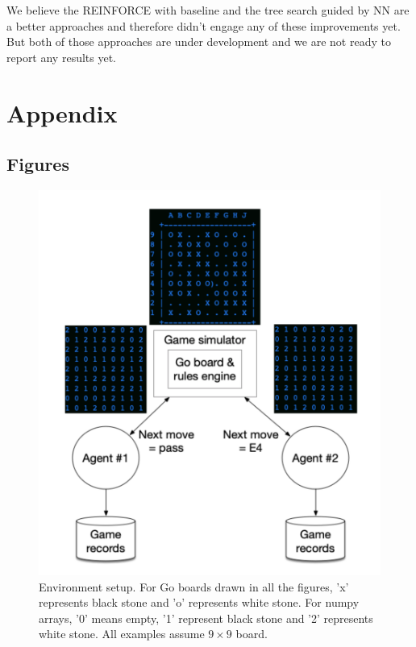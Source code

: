 \documentclass{article}
\begin{document}
    We believe the REINFORCE with baseline and the tree search guided by NN are a better approaches and therefore didn't engage any of these improvements yet.  But both of those approaches are under development and we are not ready to report any results yet. 


 

\newpage

\section{Appendix}
\subsection{Figures}
\begin{figure}
\centering
\includegraphics[width=0.8\linewidth]{simulator}
\caption{Environment setup. For Go boards drawn in all the figures, 'x' represents black stone and 'o' represents white stone. For numpy arrays, '0' means empty, '1' represent black stone and '2' represents white stone. All examples assume $9 \times 9$ board.}
\label{fig:env}
\end{figure}
\end{document}
